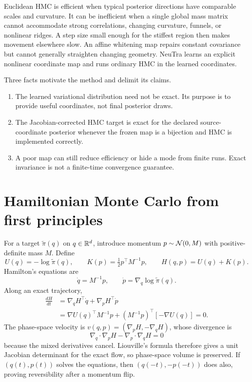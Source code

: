 Euclidean HMC is efficient when typical posterior directions have comparable
scales and curvature.  It can be inefficient when a single global mass matrix
cannot accommodate strong correlations, changing curvature, funnels, or
nonlinear ridges.  A step size small enough for the stiffest region then makes
movement elsewhere slow.  An affine whitening map repairs constant covariance
but cannot generally straighten changing geometry.  NeuTra learns an explicit
nonlinear coordinate map and runs ordinary HMC in the learned coordinates.

Three facts motivate the method and delimit its claims.
\begin{enumerate}
 \item The learned variational distribution need not be exact.  Its purpose is
   to provide useful coordinates, not final posterior draws.
 \item The Jacobian-corrected HMC target is exact for the declared
   source-coordinate posterior whenever the frozen map is a bijection and HMC
   is implemented correctly.
 \item A poor map can still reduce efficiency or hide a mode from finite runs.
   Exact invariance is not a finite-time convergence guarantee.
\end{enumerate}

\section{Hamiltonian Monte Carlo from first principles}

For a target $\widetilde\pi(q)$ on $q\in\mathbb{R}^d$, introduce momentum
$p\sim\mathcal{N}(0,M)$ with positive-definite mass $M$.  Define
\begin{equation}
 U(q)=-\log\widetilde\pi(q),\qquad
 K(p)=\tfrac12p^\top M^{-1}p,\qquad H(q,p)=U(q)+K(p).
\end{equation}
Hamilton's equations are
\begin{equation}
 \dot q=M^{-1}p,\qquad \dot p=\nabla_q\log\widetilde\pi(q).
\end{equation}
Along an exact trajectory,
\begin{align}
 \frac{dH}{dt}
 &=\nabla_qH^\top\dot q+\nabla_pH^\top\dot p\\
 &=\nabla U(q)^\top M^{-1}p
   +(M^{-1}p)^\top[-\nabla U(q)]=0.
\end{align}
The phase-space velocity is
$v(q,p)=(\nabla_pH,-\nabla_qH)$, whose divergence is
\begin{equation}
 \nabla_q\!\cdot\nabla_pH-\nabla_p\!\cdot\nabla_qH=0
\end{equation}
because the mixed derivatives cancel.  Liouville's formula therefore gives a
unit Jacobian determinant for the exact flow, so phase-space volume is
preserved.  If $(q(t),p(t))$ solves the equations, then
$(q(-t),-p(-t))$ does also, proving reversibility after a momentum flip.


